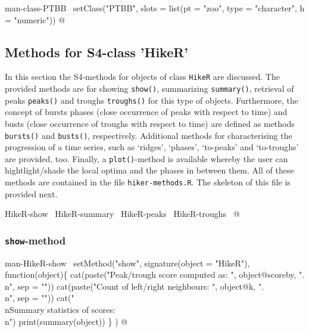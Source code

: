 \documentclass[a4paper]{article}
\begin{document}
\LA{}man-class-PTBB~{\nwtagstyle{}}\RA{}
setClass("PTBB", slots = list(pt = "zoo",
                              type = "character",
                              h = "numeric"))
\nwendcode{}@

\subsection{Methods for S4-class 'HikeR'}

In this section the S4-methods for objects of class \verb?HikeR? are
discussed. The provided methods are for showing \verb?show()?,
summarizing \verb?summary()?, retrieval of peaks \verb?peaks()? and troughs
\verb?troughs()? for this type of objects. Furthermore, the concept of
bursts phases (close occurrence of peaks with respect to time) and
busts (close occurrence of troughs with respect to time) are defined
as methods \verb?bursts()? and \verb?busts()?, respectively. Additional
methods for characterising the progression of a time series, such as
`ridges', `phases', `to-peaks' and `to-troughs' are provided,
too. Finally, a \verb?plot()?-method is available whereby the user can
hightlight/shade the local optima and the phases in between them. All
of these methods are contained in the file \verb?hiker-methods.R?. The
skeleton of this file is provided next.

\nwenddocs{}\endmoddef\let\nwnotused=\nwoutput{}
\LA{}HikeR-show~{\nwtagstyle{}}\RA{}
\LA{}HikeR-summary~{\nwtagstyle{}}\RA{}
\LA{}HikeR-peaks~{\nwtagstyle{}}\RA{}
\LA{}HikeR-troughs~{\nwtagstyle{}}\RA{}
\nwnotused{HikerMethods.R}\nwendcode{}@


\subsubsection{\texttt{show}-method}

\nwenddocs{}\endmoddef
\LA{}man-HikeR-show~{\nwtagstyle{}}\RA{}
setMethod("show",
          signature(object = "HikeR"), function(object)\{
              cat(paste("Peak/trough score computed as: ",
                        object@scoreby, ".\\n", sep = ""))
              cat(paste("Count of left/right neighbours: ", object@k,
                        ".\\n", sep = ""))
              cat("\\nSummary statistics of scores:\\n")
              print(summary(object))
          \}
)
\nwendcode{}@
\end{document}
